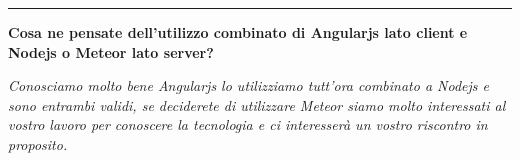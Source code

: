 \hrule
\bigskip
\textbf{Cosa ne pensate dell'utilizzo combinato di Angularjs lato client e Nodejs o Meteor lato server?}\\
\begin{margini}{0.7cm}{0.7cm}
	\textit{Conosciamo molto bene Angularjs lo utilizziamo tutt'ora combinato a Nodejs e sono entrambi validi, se deciderete di utilizzare Meteor siamo molto interessati al vostro lavoro per conoscere la tecnologia e ci interesserà un vostro riscontro in proposito.}\\
\end{margini}
